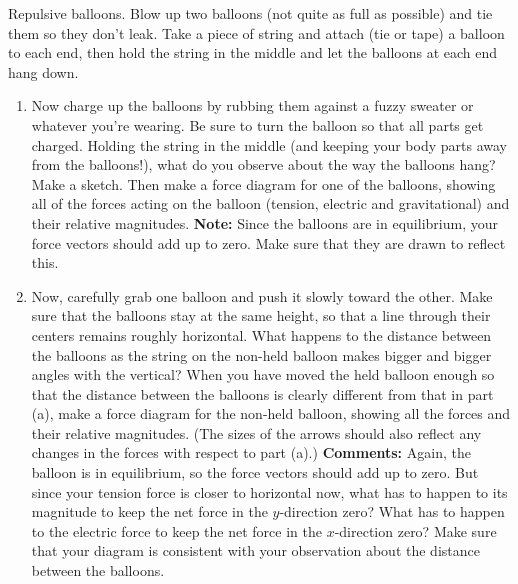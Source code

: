 \begin{aproblem}{Repulsive balloons.}  
  Blow up two balloons (not quite as full as possible) and tie them so
  they don't leak.  Take a piece of string and attach (tie or tape) a
  balloon to each end, then hold the string in the middle and let the
  balloons at each end hang down.
  \begin{enumerate}
  \item Now charge up the balloons by rubbing them against a fuzzy
    sweater or whatever you're wearing.  Be sure to turn the balloon
    so that all parts get charged.  Holding the string in the middle
    (and keeping your body parts away from the balloons!), what do you
    observe about the way the balloons hang?  Make a sketch.  Then
    make a force diagram for one of the balloons, showing all of the
    forces acting on the balloon (tension, electric and gravitational)
    and their relative magnitudes.  \textbf{Note:} Since the
    balloons are in equilibrium, your force vectors should add up to
    zero.  Make sure that they are drawn to reflect this.
  \item Now, carefully grab one balloon and push it slowly toward the
    other.  Make sure that the balloons stay at the same height, so
    that a line through their centers remains roughly horizontal.
    What happens to the distance between the balloons as the string on
    the non-held balloon makes bigger and bigger angles with the
    vertical?  When you have moved the held balloon enough so that the
    distance between the balloons is clearly different from that in
    part (a), make a force diagram for the non-held balloon, showing
    all the forces and their relative magnitudes.  (The sizes of the
    arrows should also reflect any changes in the forces with respect
    to part (a).)  \textbf{Comments: } Again, the balloon is in
    equilibrium, so the force vectors should add up to zero.  But
    since your tension force is closer to horizontal now, what has to
    happen to its magnitude to keep the net force in the $y$-direction
    zero?  What has to happen to the electric force to keep the net
    force in the $x$-direction zero?  Make sure that your diagram is
    consistent with your observation about the distance between the
    balloons.
  \end{enumerate}
\end{aproblem}


